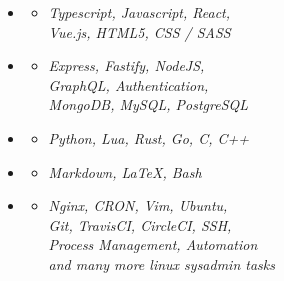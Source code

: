 \documentclass[11pt,oneside,a4paper,titlepage]{article}
\begin{document}
\begin{tcolorbox}
\begin{minipage}[t][25cm]{9cm}
\begin{tcolorbox}[grow to left by=0.55cm,colback=themeBorder,colframe=white,arc=0mm, height=26cm]
      \begin{itemize}[leftmargin=0.2cm, label={}]
        \item{
          {}
          \vspace{-0.2cm}
          \begin{itemize}[leftmargin=0.5cm]
            \item{\emph{Typescript, Javascript, React,}\\
              \emph{Vue.js, HTML5, CSS / SASS}}
          \end{itemize}
        }
        \item{
          {}
          \vspace{-0.2cm}
          \begin{itemize}[leftmargin=0.5cm]
            \item{\emph{Express, Fastify, NodeJS,}\\
            \emph{GraphQL, Authentication,}\\
          \emph{MongoDB, MySQL, PostgreSQL}}
          \end{itemize}
          }
        \item{
            {}
            \vspace{-0.2cm}
            \begin{itemize}[leftmargin=0.5cm]
              \item{\emph{Python, Lua, Rust, Go, C, C++}}
            \end{itemize}
          }
        \item{
            {}
            \vspace{-0.2cm}
            \begin{itemize}[leftmargin=0.5cm]
              \item{\emph{Markdown, LaTeX, Bash}}
            \end{itemize}
          }
        \item{
            {}
            \vspace{-0.2cm}
            \begin{itemize}[leftmargin=0.5cm]
              \item{\emph{Nginx, CRON, Vim, Ubuntu,} \\
              \emph{Git, TravisCI, CircleCI, SSH,} \\
              \emph{Process Management, Automation} \\
            \emph{and many more linux sysadmin tasks}}
            \end{itemize}
          }
      \end{itemize}


\end{tcolorbox}
\end{minipage}
\end{tcolorbox}
\end{document}
